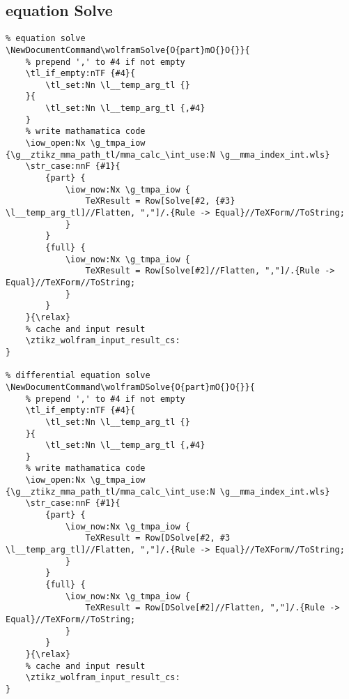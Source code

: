 \subsection{equation Solve}
\begin{verbatim}
% equation solve
\NewDocumentCommand\wolframSolve{O{part}mO{}O{}}{
    % prepend ',' to #4 if not empty
    \tl_if_empty:nTF {#4}{
        \tl_set:Nn \l__temp_arg_tl {}
    }{
        \tl_set:Nn \l__temp_arg_tl {,#4} 
    }
    % write mathamatica code
    \iow_open:Nx \g_tmpa_iow {\g__ztikz_mma_path_tl/mma_calc_\int_use:N \g__mma_index_int.wls}
    \str_case:nnF {#1}{
        {part} {
            \iow_now:Nx \g_tmpa_iow {
                TeXResult = Row[Solve[#2, {#3} \l__temp_arg_tl]//Flatten, ","]/.{Rule -> Equal}//TeXForm//ToString;
            }
        }
        {full} {
            \iow_now:Nx \g_tmpa_iow {
                TeXResult = Row[Solve[#2]//Flatten, ","]/.{Rule -> Equal}//TeXForm//ToString;
            }
        }
    }{\relax}
    % cache and input result
    \ztikz_wolfram_input_result_cs:
}

% differential equation solve
\NewDocumentCommand\wolframDSolve{O{part}mO{}O{}}{
    % prepend ',' to #4 if not empty
    \tl_if_empty:nTF {#4}{
        \tl_set:Nn \l__temp_arg_tl {}
    }{
        \tl_set:Nn \l__temp_arg_tl {,#4} 
    }
    % write mathamatica code
    \iow_open:Nx \g_tmpa_iow {\g__ztikz_mma_path_tl/mma_calc_\int_use:N \g__mma_index_int.wls}
    \str_case:nnF {#1}{
        {part} {
            \iow_now:Nx \g_tmpa_iow {
                TeXResult = Row[DSolve[#2, #3 \l__temp_arg_tl]//Flatten, ","]/.{Rule -> Equal}//TeXForm//ToString;
            }
        }
        {full} {
            \iow_now:Nx \g_tmpa_iow {
                TeXResult = Row[DSolve[#2]//Flatten, ","]/.{Rule -> Equal}//TeXForm//ToString;
            }
        }
    }{\relax}
    % cache and input result
    \ztikz_wolfram_input_result_cs:
}
\end{verbatim}